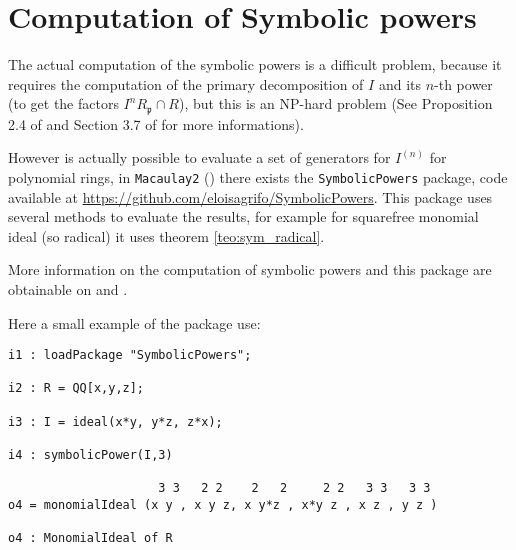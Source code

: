 \documentclass[a4wide]{book}
\theoremstyle{plain}
\theoremstyle{remark}
\theoremstyle{definition}
\newcommand{\p}{\mathfrak{p}}
\begin{document}
\section{Computation of Symbolic powers}

%

The actual computation of the symbolic powers is a difficult problem, because it requires the computation of the primary decomposition of $ I $ and its $ n $-th power (to get the factors $ I^n R_\p \cap R $), but this is an NP-hard problem (See Proposition 2.4 of \cite{Serk02} and Section 3.7 of \cite{Swa17} for more informations). 

However is actually possible to evaluate a set of generators for $ I^{(n)} $ for polynomial rings, in \verb|Macaulay2| (\cite{M2}) there exists the \verb|SymbolicPowers| package, code available at \href{https://github.com/eloisagrifo/SymbolicPowers}{https://github.com/eloisagrifo/SymbolicPowers}. This package uses several methods to evaluate the results, for example for squarefree monomial ideal (so radical) it uses theorem \ref{teo:sym_radical}. 

More information on the computation of symbolic powers and this package are obtainable on \cite{Grifo18Symb} and \cite{Grifo17computation}. 


Here a small example of the package use:

\begin{lstlisting}
i1 : loadPackage "SymbolicPowers"; 

i2 : R = QQ[x,y,z];

i3 : I = ideal(x*y, y*z, z*x);

i4 : symbolicPower(I,3)

                     3 3   2 2    2   2     2 2   3 3   3 3
o4 = monomialIdeal (x y , x y z, x y*z , x*y z , x z , y z )

o4 : MonomialIdeal of R

\end{lstlisting}
\end{document}
